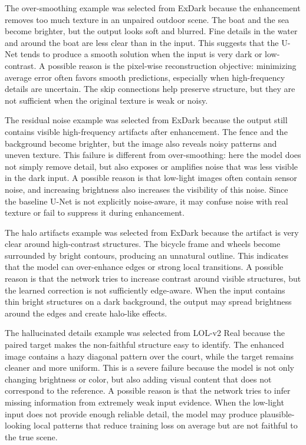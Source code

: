 The over-smoothing example was selected from ExDark because the enhancement removes too much texture in an unpaired outdoor scene. The boat and the sea become brighter, but the output looks soft and blurred. Fine details in the water and around the boat are less clear than in the input. This suggests that the U-Net tends to produce a smooth solution when the input is very dark or low-contrast. A possible reason is the pixel-wise reconstruction objective: minimizing average error often favors smooth predictions, especially when high-frequency details are uncertain. The skip connections help preserve structure, but they are not sufficient when the original texture is weak or noisy.

The residual noise example was selected from ExDark because the output still contains visible high-frequency artifacts after enhancement. The fence and the background become brighter, but the image also reveals noisy patterns and uneven texture. This failure is different from over-smoothing: here the model does not simply remove detail, but also exposes or amplifies noise that was less visible in the dark input. A possible reason is that low-light images often contain sensor noise, and increasing brightness also increases the visibility of this noise. Since the baseline U-Net is not explicitly noise-aware, it may confuse noise with real texture or fail to suppress it during enhancement.

The halo artifacts example was selected from ExDark because the artifact is very clear around high-contrast structures. The bicycle frame and wheels become surrounded by bright contours, producing an unnatural outline. This indicates that the model can over-enhance edges or strong local transitions. A possible reason is that the network tries to increase contrast around visible structures, but the learned correction is not sufficiently edge-aware. When the input contains thin bright structures on a dark background, the output may spread brightness around the edges and create halo-like effects.

The hallucinated details example was selected from LOL-v2 Real because the paired target makes the non-faithful structure easy to identify. The enhanced image contains a hazy diagonal pattern over the court, while the target remains cleaner and more uniform. This is a severe failure because the model is not only changing brightness or color, but also adding visual content that does not correspond to the reference. A possible reason is that the network tries to infer missing information from extremely weak input evidence. When the low-light input does not provide enough reliable detail, the model may produce plausible-looking local patterns that reduce training loss on average but are not faithful to the true scene.

